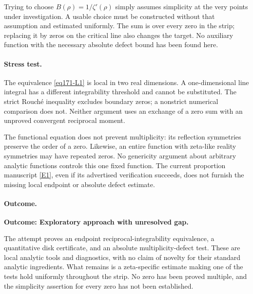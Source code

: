 \documentclass[11pt,a4paper]{article}
\newcommand{\eref}[2]{\hyperlink{extra:#1:#2}{[E#2]}}
\numberwithin{equation}{section}
\begin{document}
Trying to choose $B(\rho)=1/\zeta'(\rho)$ simply assumes simplicity at the
very points under investigation. A usable choice must be constructed
without that assumption and estimated uniformly. The sum is over every
zero in the strip; replacing it by zeros on the critical line also changes
the target. No auxiliary function with the necessary absolute defect bound
has been found here.

\paragraph{Stress test.}
The equivalence \eqref{eq171-L1} is local in two real dimensions. A
one-dimensional line integral has a different integrability threshold and
cannot be substituted. The strict Rouch\'e inequality excludes boundary
zeros; a nonstrict numerical comparison does not. Neither argument uses
an exchange of a zero sum with an unproved convergent reciprocal moment.

The functional equation does not prevent multiplicity: its reflection
symmetries preserve the order of a zero. Likewise, an entire function with
zeta-like reality symmetries may have repeated zeros. No genericity argument
about arbitrary analytic functions controls this one fixed function.
The current proportion manuscript \eref{171}{1}, even if its advertised
verification succeeds, does not furnish the missing local endpoint or
absolute defect estimate.

\paragraph{Outcome.}
\textbf{Outcome: Exploratory approach with unresolved gap.}

The attempt proves an endpoint reciprocal-integrability equivalence, a
quantitative disk certificate, and an absolute multiplicity-defect test.
These are local analytic tools and diagnostics, with no claim of novelty
for their standard analytic ingredients. What remains is a zeta-specific
estimate making one of the tests hold uniformly throughout the strip.
No zero has been proved multiple, and the simplicity assertion for every
zero has not been established.
\end{document}
